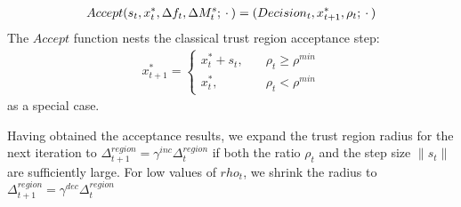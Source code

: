 \begin{align}
    Accept(s_t,x_t^{*},\Delta f_t,\Delta M_t^s;\hspace{0.2em}\cdot\hspace{0.2em})=(Decision_t,x_{t+1}^{*},\rho_t;\hspace{0.2em}\cdot\hspace{0.2em})
    \label{eq:acceptance-core}
\end{align}
The $Accept$ function nests the classical trust region acceptance step:
\begin{align}
    x_{t+1}^*=\begin{cases}
        x_t^*+s_t,\quad&\rho_t\geq\rho^{min}\\
        x_t^*,\quad&\rho_t<\rho^{min}
    \end{cases}
    \label{eq:accept-classic}
\end{align}
as a special case.

Having obtained the acceptance results, we expand the trust region radius for the next iteration to $\Delta_{t+1}^{region}=\gamma^{inc}\Delta_t^{region}$ if both the ratio $\rho_t$ and the step size $\lVert s_t\rVert$ are sufficiently large. For low values of $rho_t$, we shrink the radius to $\Delta^{region}_{t+1} = \gamma^{dec}\Delta_t^{region}$

